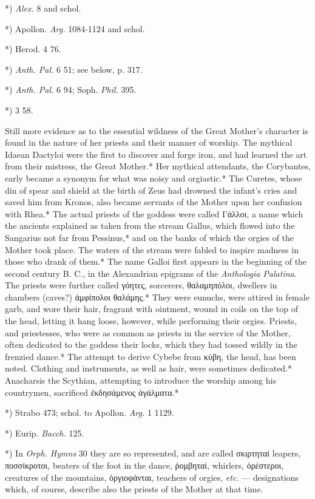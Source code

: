 \documentclass[a4paper, 11pt, oneside, polutonikogreek, english]{article}
\begin{document}
*) \emph{Alex.} 8 and schol.

*) Apollon. \emph{Arg.} 1084-1124 and schol.

*) Herod. 4 76.

*) \emph{Anth. Pal.} 6 51; see below, p. 317.

*) \emph{Anth. Pal.} 6 94; Soph. \emph{Phil.} 395.

*) 3 58.

Still more evidence as to the essential wildness of the Great Mother's character is found in the nature of her priests and their manner of worship. The mythical Idaean Dactyloi were the first to discover and forge iron, and had learned the art from their mistress, the Great Mother.* Her mythical attendants, the Corybantes, early became a synonym for what was noisy and orgiastic.* The Curetes, whose din of spear and shield at the birth of Zeus had drowned the infant's cries and saved him from Kronos, also became servants of the Mother upon her confusion with Rhea.* The actual priests of the goddess were called Γάλλοι, a name which the ancients explained as taken from the stream Gallus, which flowed into the Sangarius not far from Pessinus,* and on the banks of which the orgies of the Mother took place. The waters of the stream were fabled to inspire madness in those who drank of them.* The name Galloi first appears in the beginning of the second century B. C., in the Alexandrian epigrams of the \emph{Anthologia Palatina}. The priests were further called γόητες, sorcerers, θαλαμηπόλοι, dwellers in chambers (caves?) ἀμφίπολοι θαλάμης.* They were eunuchs, were attired in female garb, and wore their hair, fragrant with ointment, wound in coils on the top of the head, letting it hang loose, however, while performing their orgies. Priests, and priestesses, who were as common as priests in the service of the Mother, often dedicated to the goddess their locks, which they had tossed wildly in the frenzied dance.* The attempt to derive Cybebe from κύβη, the head, has been noted. Clothing and instruments, as well as hair, were sometimes dedicated.* Anacharsis the Scythian, attempting to introduce the worship among his countrymen, sacrificed ἐκδησάμενος ἀγάλματα.*

*) Strabo 473; schol. to Apollon. \emph{Arg.} 1 1129.

*) Eurip. \emph{Bacch.} 125.

*) In \emph{Orph. Hymns} 30 they are so represented, and are called σκιρτηταί leapers, ποσσίκροτοι, beaters of the foot in the dance, ῥομβηταί, whirlers, ὀρέστεροι, creatures of the mountains, ὀργιοφάνται, teachers of orgies, \emph{etc.} --- designations which, of course, describe also the priests of the Mother at that time.
\end{document}
